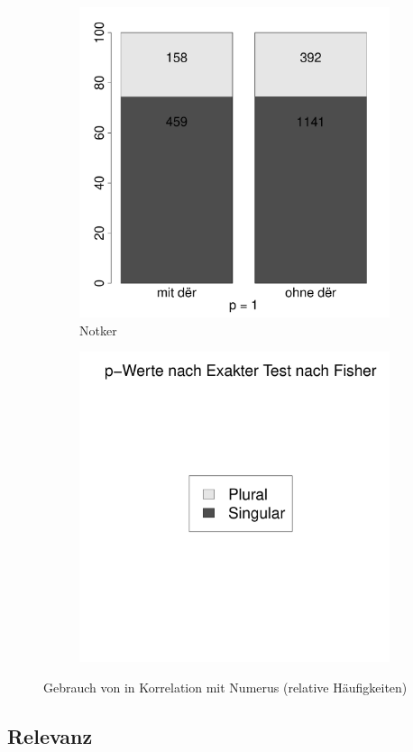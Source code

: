 \begin{figure}
\begin{subfigure}[b]{.5\linewidth}
  \includegraphics[width=6 cm]{generated/images/numerus-notker}
\caption {Notker}
\end{subfigure}%
\begin{subfigure}[b]{.5\linewidth}
  \includegraphics[width=6 cm]{generated/images/numerus-legende}
\end{subfigure}

\caption{Gebrauch von  in Korrelation mit Numerus (relative Häufigkeiten)}
\label{fig:numerus}
\end{figure}


\subsection{Relevanz}\label{sec:ergeb-relevanz}

